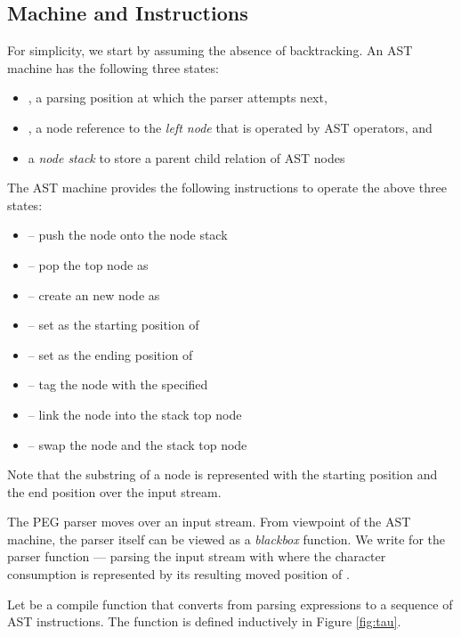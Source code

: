 \documentclass[JIP]{ipsj}
\begin{document}
\subsection{Machine and Instructions}

For simplicity, we start by assuming the absence of backtracking. An AST machine has the following three states: 

\begin{itemize}
\item , a parsing position at which the parser attempts next,
\item , a node reference to the {\em left node} that is operated by AST operators, and
\item a {\em node stack} to store a parent child relation of AST nodes
\end{itemize}

The AST machine provides the following instructions to operate the above three states:

\begin{itemize}
\item  -- push the  node onto the node stack
\item  -- pop the top node as 
\item  -- create an new node as 
\item  -- set  as the starting position of 
\item  -- set  as the ending position of 
\item  -- tag the  node with the specified  
\item  -- link the  node into the stack top node
\item  -- swap the  node and the stack top node
\end{itemize}

Note that the substring of a node is represented with the starting position and the end position over the input stream. 

The PEG parser moves over an input stream. From viewpoint of the AST machine, the parser itself can be viewed as a {\em blackbox} function. We write  for the parser function --- parsing the input stream with  where the character consumption is represented by its resulting moved position of .

Let  be a compile function that converts from parsing expressions to a sequence of AST instructions. The function  is defined inductively in Figure \ref{fig:tau}.
\end{document}
